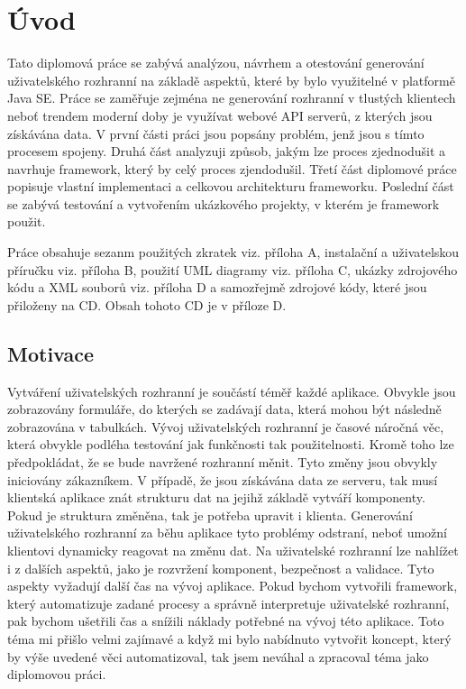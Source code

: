 \chapter{Úvod}
Tato diplomová práce se zabývá analýzou, návrhem a otestování generování uživatelského rozhranní na základě aspektů, které by bylo využitelné v platformě Java SE. Práce se zaměřuje zejména ne generování rozhranní v tlustých klientech neboť trendem moderní doby je využívat webové API serverů, z kterých jsou získávána data. V první části práci jsou popsány problém, jenž jsou s tímto procesem spojeny. Druhá část analyzuji způsob, jakým lze proces zjednodušit a navrhuje framework, který by celý proces zjendodušil. Třetí část diplomové práce popisuje vlastní implementaci a celkovou architekturu frameworku. Poslední část se zabývá testování a vytvořením ukázkového projekty, v kterém je framework použit.

Práce obsahuje sezanm použitých zkratek viz. příloha A, instalační a uživatelskou příručku viz. příloha B, použití UML diagramy viz. příloha C, ukázky zdrojového kódu a XML souborů viz. příloha D a samozřejmě zdrojové kódy, které jsou přiloženy na CD. Obsah tohoto CD je v příloze D.
\section{Motivace}
Vytváření uživatelských rozhranní je součástí téměř každé aplikace. Obvykle jsou zobrazovány formuláře, do kterých se zadávají data, která mohou být následně zobrazována v tabulkách. Vývoj uživatelských rozhranní je časové náročná věc, která obvykle podléha testování jak funkčnosti tak použitelnosti. Kromě toho lze předpokládat, že se bude navržené rozhranní měnit. Tyto změny jsou obvykly iniciovány zákazníkem. V případě, že jsou získávána data ze serveru, tak musí klientská aplikace znát strukturu dat na jejihž základě vytváří komponenty. Pokud je struktura změněna, tak je potřeba upravit i klienta. Generování uživatelského rozhranní za běhu aplikace tyto problémy odstraní, neboť umožní klientovi dynamicky reagovat na změnu dat. Na uživatelské rozhranní lze nahlížet i z dalších aspektů, jako je rozvržení komponent, bezpečnost a validace. Tyto aspekty vyžadují další čas na vývoj aplikace. Pokud bychom vytvořili framework, který automatizuje zadané procesy a správně interpretuje uživatelské rozhranní, pak bychom ušetřili čas a snížili náklady potřebné na vývoj této aplikace. Toto téma mi přišlo velmi zajímavé a když mi bylo nabídnuto vytvořit koncept, který by výše uvedené věci automatizoval, tak jsem neváhal a zpracoval téma jako diplomovou práci.